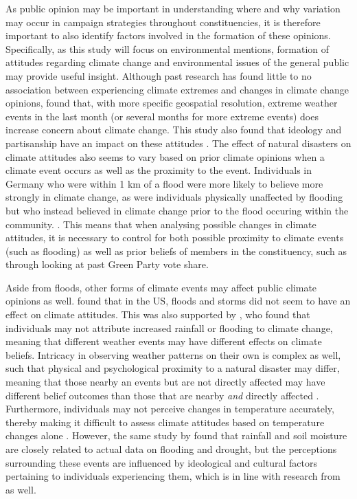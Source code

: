 \documentclass[12pt,letterpaper]{article}
\begin{document}
As public opinion may be important in understanding where and why variation may occur in campaign strategies throughout constituencies, it is therefore important to also identify factors involved in the formation of these opinions. Specifically, as this study will focus on environmental mentions, formation of attitudes regarding climate change and environmental issues of the general public may provide useful insight. Although past research has found little to no association between experiencing climate extremes and changes in climate change opinions, \textcite{koniskyExtremeWeatherEvents2016} found that, with more specific geospatial resolution, extreme weather events in the last month (or several months for more extreme events) does increase concern about climate change. This study also found that ideology and partisanship have an impact on these attitudes \autocite{koniskyExtremeWeatherEvents2016}. The effect of natural disasters on climate attitudes also seems to vary based on prior climate opinions when a climate event occurs as well as the proximity to the event. Individuals in Germany who were within 1 km of a flood  were more likely to believe more strongly in climate change, as were individuals physically unaffected by flooding but who instead believed in climate change prior to the flood occuring within the community. \autocite{osberghausNaturalDisastersClimate2022}. This means that when analysing possible changes in climate attitudes, it is necessary to control for both possible proximity to climate events (such as flooding) as well as prior beliefs of members in the constituency, such as through looking at past Green Party vote share.

Aside from floods, other forms of climate events may affect public climate opinions as well. \textcite{viscontiEffectDifferentExtreme2024} found that in the US, floods and storms did not seem to have an effect on climate attitudes. This was also supported by \textcite{loComeRainShine2015}, who found that individuals may not attribute increased rainfall or flooding to climate change, meaning that different weather events may have different effects on climate beliefs. Intricacy in observing weather patterns on their own is complex as well, such that physical and psychological proximity to a natural disaster may differ, meaning that those nearby an events but are not directly affected may have different belief outcomes than those that are nearby \textit{and} directly affected \autocite{siscoEffectsWeatherExperiences2021}. Furthermore, individuals may not perceive changes in temperature accurately, thereby making it difficult to assess climate attitudes based on temperature changes alone \autocite{goebbertWeatherClimateWorldviews2012}. However, the same study by \textcite{goebbertWeatherClimateWorldviews2012} found that rainfall and soil moisture are closely related to actual data on flooding and drought, but the perceptions surrounding these events are influenced by ideological and cultural factors pertaining to individuals experiencing them, which is in line with research from \textcite{osberghausNaturalDisastersClimate2022} as well.
\end{document}
